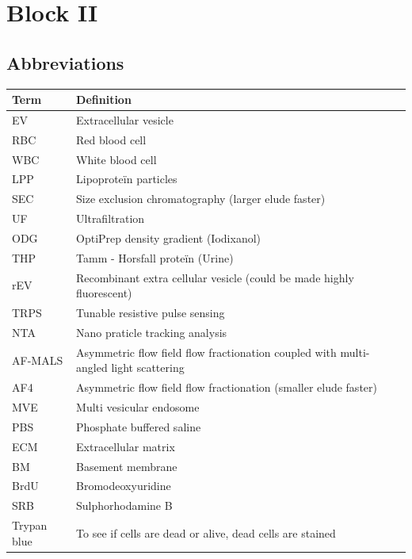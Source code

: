 \documentclass{article}
\begin{document}
\begin{table}[H]
\begin{tabular}{|l|l|}
\end{tabular}
\end{table}


\section{Block II}

\subsection{Abbreviations}

\begin{table}[H]
\begin{tabular}{|l|l|}
\hline
\textbf{Term} & \textbf{Definition} \\ \hline
EV & Extracellular vesicle \\ \hline
RBC & Red blood cell \\ \hline
WBC & White blood cell \\ \hline
LPP & Lipoproteïn particles \\ \hline
SEC & Size exclusion chromatography (larger elude faster)\\ \hline
UF & Ultrafiltration \\ \hline
ODG & OptiPrep density gradient (Iodixanol) \\ \hline
THP & Tamm - Horsfall proteïn (Urine) \\ \hline
rEV & Recombinant extra cellular vesicle (could be made highly fluorescent) \\ \hline
TRPS & Tunable resistive pulse sensing \\ \hline
NTA & Nano praticle tracking analysis \\ \hline
AF-MALS & Asymmetric flow field flow fractionation coupled with multi-angled light scattering \\ \hline
AF4 & Asymmetric flow field flow fractionation (smaller elude faster)\\ \hline
MVE & Multi vesicular endosome  \\ \hline
PBS & Phosphate buffered saline \\ \hline
ECM & Extracellular matrix \\ \hline
BM & Basement membrane \\ \hline
BrdU & Bromodeoxyuridine \\ \hline
SRB & Sulphorhodamine B \\ \hline
Trypan blue & To see if cells are dead or alive, dead cells are stained \\ \hline

\end{tabular}
\end{table}
\end{document}
